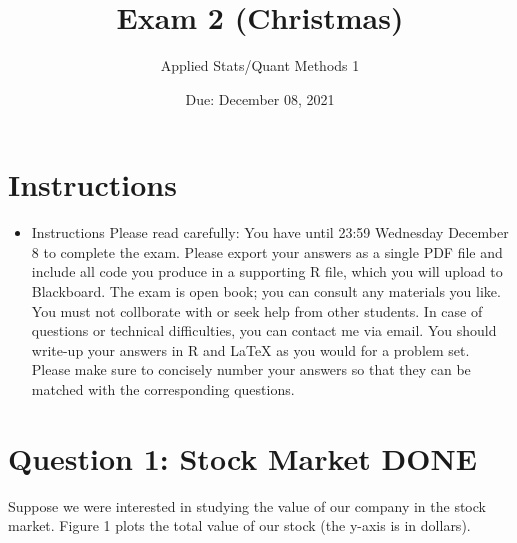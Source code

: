 \documentclass[12pt,letterpaper]{article}
\title{Exam 2 (Christmas)}
\date{Due: December 08, 2021}
\author{Applied Stats/Quant Methods 1}
\begin{document}
	\maketitle
	\section*{Instructions}
	\begin{itemize}
		\item Instructions
		Please read carefully: You have until 23:59 Wednesday December 8 to complete
		the exam. Please export your answers as a single PDF file and include all code you
		produce in a supporting R file, which you will upload to Blackboard. The exam is
		open book; you can consult any materials you like. You must not collborate with
		or seek help from other students. In case of questions or technical difficulties, you
		can contact me via email. You should write-up your answers in R and LaTeX as you
		would for a problem set. Please make sure to concisely number your answers so that
		they can be matched with the corresponding questions. 
		
		
	\end{itemize}
	
	
	\newpage
	
	\vspace{.5cm}
	\section*{Question 1: Stock Market DONE}
	Suppose we were interested in studying the value of our company in the stock market. Figure
	1 plots the total value of our stock (the y-axis is in dollars).
	
\end{document}

